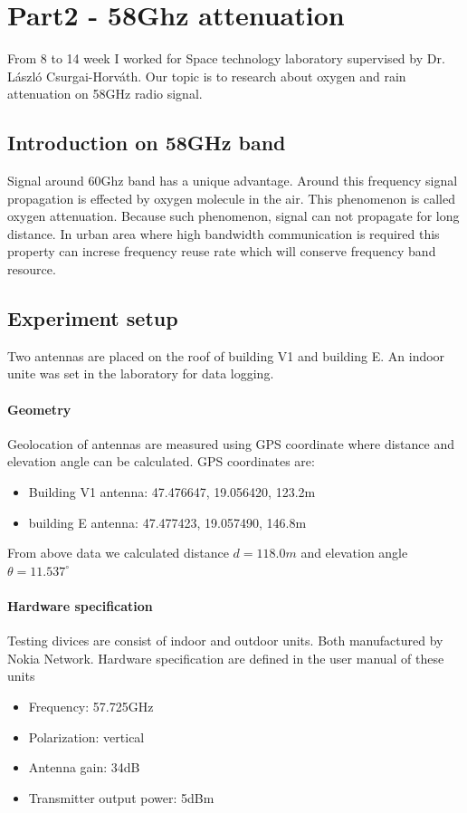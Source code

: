 \documentclass[
11pt, %
a4paper, %
oneside, %
headinclude,footinclude, %
BCOR5mm, %
]{scrartcl}
\begin{document}
\section{Part2 - 58Ghz attenuation}
From 8 to 14 week I worked for Space technology laboratory supervised by Dr. László Csurgai-Horváth.
Our topic is to research about oxygen and rain attenuation on 58GHz radio signal.

\subsection{Introduction on 58GHz band}
Signal around 60Ghz band has a unique advantage. Around this frequency
signal propagation is effected by oxygen molecule in the air. This phenomenon is 
called oxygen attenuation. Because such phenomenon, signal can not propagate for long distance.
In urban area where high bandwidth communication is required this property can increse
frequency reuse rate which will conserve frequency band resource.

\subsection{Experiment setup}
Two antennas are placed on the roof of building V1 and building E.
An indoor unite was set in the laboratory for data logging.

\paragraph{Geometry}
Geolocation of antennas are measured using GPS coordinate where distance and
elevation angle can be calculated.
GPS coordinates are:
\begin{itemize}
    \item Building V1 antenna: 47.476647, 19.056420, 123.2m
    \item building E antenna: 47.477423, 19.057490, 146.8m
\end{itemize}

From above data we calculated distance $d = 118.0m$ 
and elevation angle $\theta = 11.537^\circ$

\paragraph{Hardware specification}
Testing divices are consist of indoor and outdoor units. Both manufactured by 
Nokia Network. Hardware specification are 
defined in the user manual of these units \cite{metrohopper}
\begin{itemize}
    \item Frequency: 57.725GHz
    \item Polarization: vertical
    \item Antenna gain: 34dB
    \item Transmitter output power: 5dBm
\end{itemize}
\end{document}
